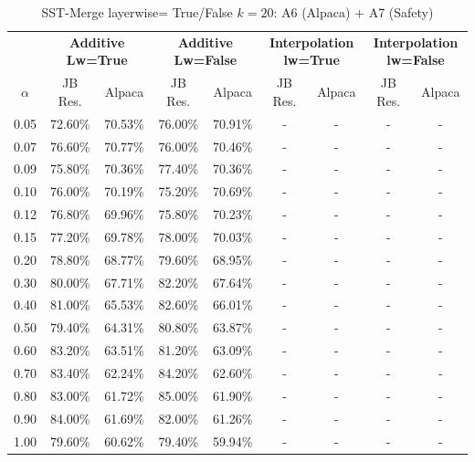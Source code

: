 \begin{table}[h]
\centering
\caption{SST-Merge layerwise= True/False $k=20$: A6 (Alpaca) + A7 (Safety)}
\label{tab:res_a6_sst_20}
\begin{tabular}{c|cc|cc|cc|cc}
\hline
 & \multicolumn{2}{c|}{\textbf{Additive Lw=True}} & \multicolumn{2}{c|}{\textbf{Additive Lw=False}} & \multicolumn{2}{c|}{\textbf{Interpolation lw=True}}& \multicolumn{2}{c}{\textbf{Interpolation lw=False}} \\
$\alpha$ & JB Res. & Alpaca & JB Res. & Alpaca & JB Res. & Alpaca & JB Res. & Alpaca \\
\hline
0.05 & 72.60\% & 70.53\% & 76.00\% & 70.91\% & - & - & - & - \\
0.07 & 76.60\% & 70.77\% & 76.00\% & 70.46\% & - & - & - & - \\
0.09 & 75.80\% & 70.36\% & 77.40\% & 70.36\% & - & - & - & - \\
0.10 & 76.00\% & 70.19\% & 75.20\% & 70.69\% & - & - & - & - \\
0.12 & 76.80\% & 69.96\% & 75.80\% & 70.23\% & - & - & - & - \\
0.15 & 77.20\% & 69.78\% & 78.00\% & 70.03\% & - & - & - & - \\
0.20 & 78.80\% & 68.77\% & 79.60\% & 68.95\% & - & - & - & - \\
0.30 & 80.00\% & 67.71\% & 82.20\% & 67.64\% & - & - & - & - \\
0.40 & 81.00\% & 65.53\% & 82.60\% & 66.01\% & - & - & - & - \\
0.50 & 79.40\% & 64.31\% & 80.80\% & 63.87\% & - & - & - & - \\
0.60 & 83.20\% & 63.51\% & 81.20\% & 63.09\% & - & - & - & - \\
0.70 & 83.40\% & 62.24\% & 84.20\% & 62.60\% & - & - & - & - \\
0.80 & 83.00\% & 61.72\% & 85.00\% & 61.90\% & - & - & - & - \\
0.90 & 84.00\% & 61.69\% & 82.00\% & 61.26\% & - & - & - & - \\
1.00 & 79.60\% & 60.62\% & 79.40\% & 59.94\% & - & - & - & - \\
\hline
\end{tabular}
\end{table}
\FloatBarrier


